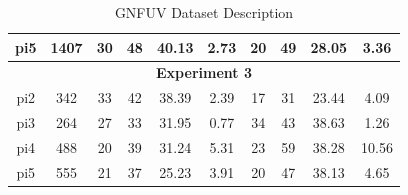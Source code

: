 \documentclass{mpaper}
\begin{document}
\begin{table}[]
\begin{tabular}{|cccccccccc|}
\multicolumn{1}{|c|}{pi5}           & \multicolumn{1}{c|}{1407}                    & 30  & 48  & 40.13 & \multicolumn{1}{c|}{2.73} & 20      & 49      & 28.05     & 3.36      \\ \hline
\multicolumn{10}{|c|}{\textbf{Experiment 3}}                                                                                                                                   \\ \hline
\multicolumn{1}{|c|}{pi2}           & \multicolumn{1}{c|}{342}                     & 33  & 42  & 38.39 & \multicolumn{1}{c|}{2.39} & 17      & 31      & 23.44     & 4.09      \\
\multicolumn{1}{|c|}{pi3}           & \multicolumn{1}{c|}{264}                     & 27  & 33  & 31.95 & \multicolumn{1}{c|}{0.77} & 34      & 43      & 38.63     & 1.26      \\
\multicolumn{1}{|c|}{pi4}           & \multicolumn{1}{c|}{488}                     & 20  & 39  & 31.24 & \multicolumn{1}{c|}{5.31} & 23      & 59      & 38.28     & 10.56     \\
\multicolumn{1}{|c|}{pi5}           & \multicolumn{1}{c|}{555}                     & 21  & 37  & 25.23 & \multicolumn{1}{c|}{3.91} & 20      & 47      & 38.13     & 4.65      \\ \hline
\end{tabular}
\caption{\label{tab:gnfuv}GNFUV Dataset Description}
\end{table}
\end{document}
